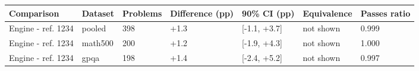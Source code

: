 \begin{tabular}{lllllll}
\toprule
Comparison & Dataset & Problems & Difference (pp) & 90\% CI (pp) & Equivalence & Passes ratio \\
\midrule
Engine - ref. 1234 & pooled & 398 & +1.3 & [-1.1, +3.7] & not shown & 0.999 \\
Engine - ref. 1234 & math500 & 200 & +1.2 & [-1.9, +4.3] & not shown & 1.000 \\
Engine - ref. 1234 & gpqa & 198 & +1.4 & [-2.4, +5.2] & not shown & 0.997 \\
\bottomrule
\end{tabular}

